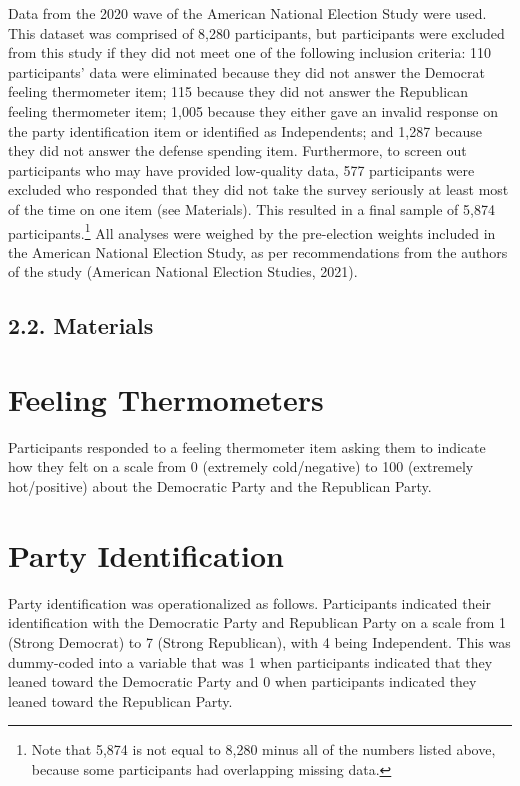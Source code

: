 \documentclass[authordate, meta, issue]{jote-new-article}
\begin{document}
	Data from the 2020 wave of the American National Election Study were used. This dataset was comprised of 8,280 participants, but participants were excluded from this study if they did not meet one of the following inclusion criteria: 110 participants' data were eliminated because they did not answer the Democrat feeling thermometer item; 115 because they did not answer the Republican feeling thermometer item; 1,005 because they either gave an invalid response on the party identification item or identified as Independents; and 1,287 because they did not answer the defense spending item. Furthermore, to screen out participants who may have provided low-quality data, 577 participants were excluded who responded that they did not take the survey seriously at least most of the time on one item (see Materials). This resulted in a final sample of 5,874 participants.\footnote{ Note that 5,874 is not equal to 8,280 minus all of the numbers listed above, because some participants had overlapping missing data.} All analyses were weighed by the pre-election weights included in the American National Election Study, as per recommendations from the authors of the study (American National Election Studies, 2021).



	\subsection{2.2. Materials}



	\section{\textbf{Feeling Thermometers}}



	Participants responded to a feeling thermometer item asking them to indicate how they felt on a scale from 0 (extremely cold/negative) to 100 (extremely hot/positive) about the Democratic Party and the Republican Party.



	\section{\textbf{Party Identification}}



	Party identification was operationalized as follows. Participants indicated their identification with the Democratic Party and Republican Party on a scale from 1 (Strong Democrat) to 7 (Strong Republican), with 4 being Independent. This was dummy-coded into a variable that was 1 when participants indicated that they leaned toward the Democratic Party and 0 when participants indicated they leaned toward the Republican Party.
\end{document}
